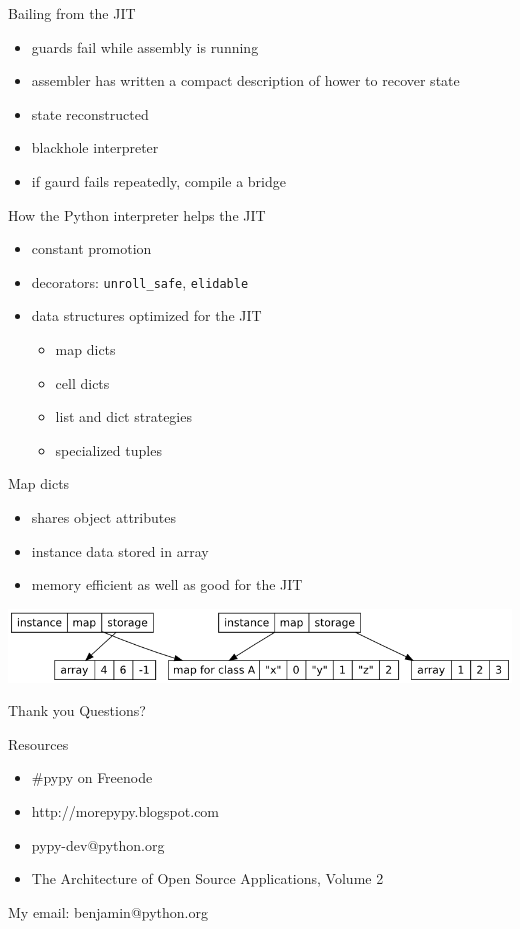 \documentclass[14pt]{beamer}
\begin{document}
\begin{frame}{Bailing from the JIT}
\begin{itemize}
\item guards fail while assembly is running
\item assembler has written a compact description of hower to recover state
\item state reconstructed
\item blackhole interpreter
\item if gaurd fails repeatedly, compile a bridge
\end{itemize}
\end{frame}

\begin{frame}[fragile]{How the Python interpreter helps the JIT}
\begin{itemize}
\item constant promotion
\item decorators: \verb+unroll_safe+, \verb+elidable+
\item data structures optimized for the JIT
\begin{itemize}
\item map dicts
\item cell dicts
\item list and dict strategies
\item specialized tuples
\end{itemize}
\end{itemize}
\end{frame}

\begin{frame}{Map dicts}
\begin{itemize}
\item shares object attributes
\item instance data stored in array
\item memory efficient as well as good for the JIT
\end{itemize}
\includegraphics[scale=.45]{instancemap.png}
\end{frame}

\begin{frame}[fragile]{Thank you}
Questions?

Resources
\begin{itemize}
\item \#pypy on Freenode
\item http://morepypy.blogspot.com
\item pypy-dev@python.org
\item The Architecture of Open Source Applications, Volume 2
\end{itemize}


My email: benjamin@python.org
\end{frame}
\end{document}
